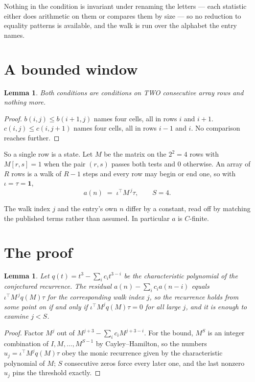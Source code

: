 \documentclass[11pt,a4paper]{article}
\theoremstyle{plain}
\newtheorem{lemma}[theorem]{Lemma}
\theoremstyle{definition}
\begin{document}
Nothing in the condition is invariant under renaming the letters --- each statistic either does
arithmetic on them or compares them by size --- so no reduction to equality patterns is
available, and the walk is run over the alphabet the entry names.

\section{A bounded window}

\begin{lemma}\label{lem:win}
Both conditions are conditions on TWO consecutive array rows and nothing more.
\end{lemma}

\begin{proof}
$b(i,j)\le b(i{+}1,j)$ names four cells, all in rows $i$ and $i+1$. $c(i,j)\le c(i,j{+}1)$
names four cells, all in rows $i-1$ and $i$. No comparison reaches further.
\end{proof}

So a single row is a state. Let $M$ be the matrix on the $2^{2}=4$ rows with
$M[r,s]=1$ when the pair $(r,s)$ passes both tests and $0$ otherwise. An array of $R$ rows is a
walk of $R-1$ steps and every row may begin or end one, so with $\iota=\tau=\mathbf{1}$,
\[
a(n)\;=\;\iota^{\!\top}M^{\,j}\tau ,\qquad S=4.
\]

The walk index $j$ and the entry's own $n$ differ by a constant, read off by matching the
published terms rather than assumed. In particular $a$ is $C$-finite.

\section{The proof}

\begin{lemma}\label{lem:crit}
Let $q(t)=t^{3}-\sum_i c_it^{3-i}$ be the characteristic polynomial of the
conjectured recurrence. The residual $a(n)-\sum_ic_ia(n-i)$ equals
$\iota^{\!\top}M^{\,j}q(M)\tau$ for the corresponding walk index $j$, so the recurrence
holds from some point on if and only if $\iota^{\!\top}M^{j}q(M)\tau=0$ for all large $j$,
and it is enough to examine $j<S$.
\end{lemma}

\begin{proof}
Factor $M^{j}$ out of $M^{j+3}-\sum_ic_iM^{j+3-i}$. For the bound, $M^{S}$
is an integer combination of $I,M,\dots,M^{S-1}$ by Cayley--Hamilton, so the numbers
$u_j=\iota^{\!\top}M^{j}q(M)\tau$ obey the monic recurrence given by the characteristic
polynomial of $M$; $S$ consecutive zeros force every later one, and the last nonzero $u_j$
pins the threshold exactly.
\end{proof}
\end{document}

